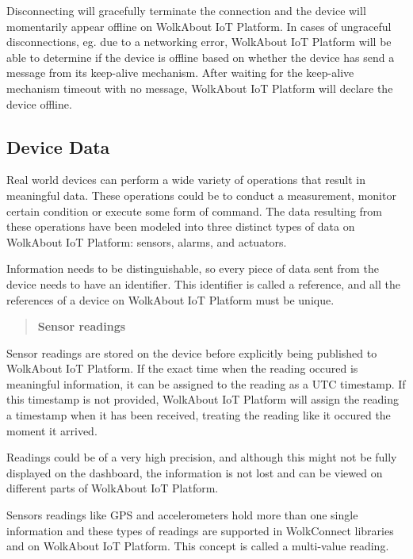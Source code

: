 Disconnecting will gracefully terminate the connection and the device will momentarily appear offline on Wolk\+About IoT Platform. In cases of ungraceful disconnections, eg. due to a networking error, Wolk\+About IoT Platform will be able to determine if the device is offline based on whether the device has send a message from its keep-\/alive mechanism. After waiting for the keep-\/alive mechanism timeout with no message, Wolk\+About IoT Platform will declare the device offline.

\subsection*{Device Data}





Real world devices can perform a wide variety of operations that result in meaningful data. These operations could be to conduct a measurement, monitor certain condition or execute some form of command. The data resulting from these operations have been modeled into three distinct types of data on Wolk\+About IoT Platform\+: sensors, alarms, and actuators.

Information needs to be distinguishable, so every piece of data sent from the device needs to have an identifier. This identifier is called a reference, and all the references of a device on Wolk\+About IoT Platform must be unique.

\label{_sensor-readings}%
 \begin{quote}
{\bfseries Sensor readings} \end{quote}
Sensor readings are stored on the device before explicitly being published to Wolk\+About IoT Platform. If the exact time when the reading occured is meaningful information, it can be assigned to the reading as a U\+TC timestamp. If this timestamp is not provided, Wolk\+About IoT Platform will assign the reading a timestamp when it has been received, treating the reading like it occured the moment it arrived.

Readings could be of a very high precision, and although this might not be fully displayed on the dashboard, the information is not lost and can be viewed on different parts of Wolk\+About IoT Platform.

Sensors readings like G\+PS and accelerometers hold more than one single information and these types of readings are supported in Wolk\+Connect libraries and on Wolk\+About IoT Platform. This concept is called a multi-\/value reading.

